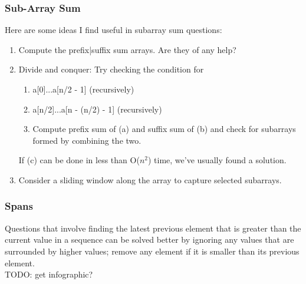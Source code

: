 \documentclass{report}
\begin{document}
\subsubsection{Sub-Array Sum}
Here are some ideas I find useful in subarray sum questions:
\begin{enumerate}
    \item Compute the prefix|suffix sum arrays. Are they of any help?
    \item Divide and conquer: Try checking the condition for
    \begin{enumerate}
        \item a[0]...a[n/2 - 1] (recursively)
        \item a[n/2]...a[n - (n/2) - 1] (recursively)
        \item Compute prefix sum of (a) and suffix sum of (b)
        and check for subarrays formed by combining the two.
    \end{enumerate}
    If (c) can be done in less than O($n^2$) time, we've usually found a solution.
    \item Consider a sliding window along the array to capture selected
    subarrays. 
\end{enumerate}
\subsubsection{Spans}
Questions that involve finding the latest previous element that is greater than the 
current value in a sequence can be solved better by ignoring any values that are
surrounded by higher values; remove any element if it is smaller than its previous
element.\\
TODO: get infographic?
\end{document}
